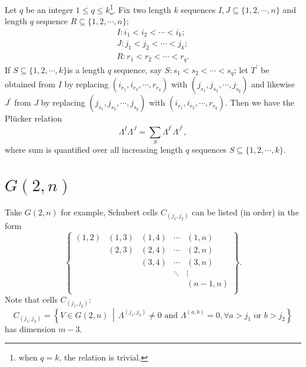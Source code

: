 \documentclass[11pt]{homework}
\begin{document}
\begin{proposition}
    Let $q$ be an integer $1\leq q \leq k$\footnote{when $q=k$, the relation is trivial.}.
    Fix two length $k$ sequences $I,J\subseteq \{1,2,\cdots,n\}$ and length $q$ sequence $R \subseteq \{1,2,\cdots,n\}$;
    \begin{align*}
        I: i_1 < i_2 < \cdots < i_k;\\
        J: j_1 < j_2 < \cdots < j_k;\\
        R: r_1 < r_2 < \cdots < r_q.
    \end{align*}
    If $S\subseteq \{1,2,\cdots,k\}$is a length $q$ sequence, say $S: s_1 < s_2 < \cdots < s_q$; let $T^\prime$ be obtained from $I$ by replacing $(i_{r_1}, i_{r_2}, \cdots, r_{r_q})$ with $(j_{s_1}, j_{s_2}, \cdots, j_{s_q})$ and likewise $J^\prime$ from $J$ by replacing $(j_{s_1}, j_{s_2}, \cdots, j_{s_q})$ with $(i_{r_1}, i_{r_2}, \cdots, r_{r_q})$.
    Then we have the Plücker relation
    \begin{equation}
        \label{eqn:plucker_relation}
        \Lambda^I \Lambda^J = \sum_S \Lambda^{I^\prime} \Lambda^{J^\prime},
    \end{equation}
    where sum is quantified over all increasing length $q$ sequences $S\subseteq \{1,2,\cdots,k\}$.
\end{proposition}

\section{$G(2,n)$}
Take $G(2,n)$ for example, Schubert cells $C_{(j_1,j_2)}$ can be listed (in order) in the form
\begin{equation*}
    \begin{Bmatrix}
        (1,2) & (1,3) & (1,4) & \cdots & (1,n)\\
              & (2,3) & (2,4) & \cdots & (2,n)\\
              &       & (3,4) & \cdots & (3,n)\\
              &       &       & \ddots & \vdots\\
              &       &       &        & (n-1,n)\\
    \end{Bmatrix}.
\end{equation*}
Note that cells $C_{(j_1,j_2)}$:
\begin{equation*}
    C_{(j_1,j_2)} = \left\{V \in G(2, n) \, \middle | \, \Lambda^{(j_1,j_2)} \neq 0 \text{ and } \Lambda^{(a,b)}=0, \forall a > j_1 \text{ or } b > j_2 \right\}
\end{equation*}
has dimension $m-3$.
\end{document}
